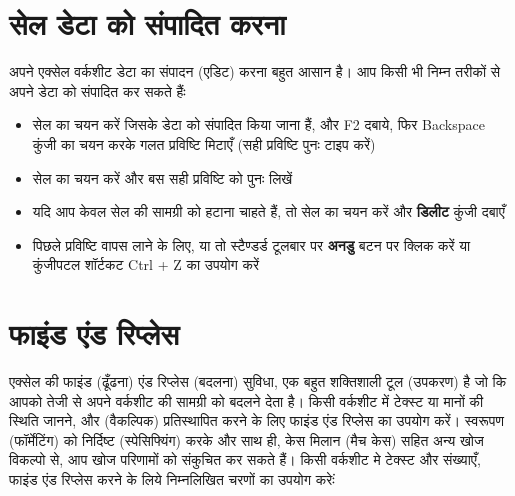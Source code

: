 \section{सेल डेटा को संपादित करना}\label{id-1.35}

अपने एक्सेल वर्कशीट डेटा का संपादन (एडिट) करना बहुत आसान है। आप किसी भी निम्न तरीकों से अपने डेटा को संपादित कर सकते हैंः

\begin{itemize}[topsep=-1ex,parsep=0ex,partopsep=0ex,itemsep=0.5ex]
\item सेल का चयन करें जिसके डेटा को संपादित किया जाना हैं, और  {\rm F2}  दबाये, फिर   {\rm Backspace}  कुंजी का चयन करके गलत प्रविष्टि मिटाएँ (सही प्रविष्टि पुनः टाइप करें)
\item सेल का चयन करें और बस सही प्रविष्टि को पुनः लिखें
\item यदि आप केवल सेल की सामग्री को हटाना चाहते हैं, तो सेल का चयन करें और \textbf{डिलीट} कुंजी दबाएँ
\item पिछले प्रविष्टि वापस लाने के लिए, या तो स्टैण्डर्ड टूलबार पर \textbf{अनडु} बटन पर क्लिक करें या कुंजीपटल शॉर्टकट  {\rm Ctrl + Z}   का उपयोग करें
\end{itemize}

\section{फाइंड एंड रिप्लेस}\label{id-1.36}

एक्सेल की फाइंड (ढूँढना) एंड रिप्लेस (बदलना) सुविधा, एक बहुत शक्तिशाली टूल (उपकरण) है जो कि आपको तेजी से अपने वर्कशीट की सामग्री को बदलने देता है। किसी वर्कशीट में टेक्स्ट या मानों की स्थिति जानने, और (वैकल्पिक) प्रतिस्थापित करने के लिए फाइंड एंड रिप्लेस का उपयोग करें। स्वरूपण (फॉर्मेटिंग) को निर्दिष्ट (स्पेसिफ्यिंग) करके और साथ ही, केस मिलान (मैच केस) सहित अन्य खोज विकल्पो से, आप खोज परिणामों को संकुचित कर सकते हैं। किसी वर्कशीट मे टेक्स्ट और संख्याएँ, फाइंड एंड रिप्लेस करने के लिये निम्नलिखित चरणों का उपयोग करेःं

